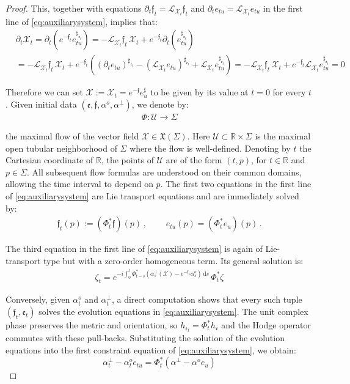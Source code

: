\documentclass[10pt,reqno,a4paper]{amsart}
\theoremstyle{plain}
\theoremstyle{definition}
\theoremstyle{remark}
\theoremstyle{remark}
\def\dd{\mathrm{d}}
\def\cL{\mathcal{L}}
\def\cX{\mathcal{X}}
\def\cL{\mathcal{L}}
\def\cU{\mathcal{U}}
\def\fre{\mathfrak{e}}
\renewcommand{\(}{ (}
\renewcommand{\)}{ )}
\newcommand{\frf}{\mathfrak{f}}
\begin{document}
\begin{proof}
\noindent
This, together with equations $\partial_t \frf_t =  \cL_{\cX_t}\frf_t$ and $\partial_t e_{tu} = \mathcal{L}_{\cX_t} e_{tu}$ in the first line of \eqref{eq:auxiliarysystem}, implies that:
\begin{eqnarray*}
 & \partial_t \cX_t = \partial_t (e^{-\frf_t} e^{\sharp_{\fre_t}}_{tu})  =  -  \cL_{\cX_t}\frf_t\, \cX_t + e^{-\frf_t}  \partial_t (e^{\sharp_{\fre_t}}_{tu}) \\
 & =  -  \cL_{\cX_t}\frf_t\, \cX_t + e^{-\frf_t}  ((\partial_t e_{tu})^{\sharp_{\fre_t}} -   (\cL_{\cX_t} e_{tu})^{\sharp_{\fre_t}} + \cL_{\cX_t} e_{tu}^{\sharp_{\fre_t}}) = -  \cL_{\cX_t}\frf_t\, \cX_t + e^{-\frf_t} \cL_{\cX_t} e_{tu}^{\sharp_{\fre_t}} = 0
\end{eqnarray*}

\noindent
Therefore we can set $\cX := \cX_t = e^{-\frf} e^{\sharp}_u$ to be given by its value at $t=0$ for every $t$. Given initial data $(\fre,\frf,\alpha^o,\alpha^{\perp})$, we denote by:
\begin{eqnarray*}
\Phi \colon \cU \to \Sigma
\end{eqnarray*}

\noindent
the maximal flow of the vector field $\cX\in \mathfrak{X}(\Sigma)$. Here $\cU \subset \mathbb{R} \times \Sigma$ is the maximal open tubular neighborhood of $\Sigma$ where the flow is well-defined. Denoting by $t$ the Cartesian coordinate of $\mathbb{R}$, the points of $\cU$ are of the form $(t,p)$, for $t\in\mathbb{R}$ and $p\in \Sigma$. All subsequent flow formulas are understood on their common domains, allowing the time interval to depend on $p$. The first two equations in the first line of \eqref{eq:auxiliarysystem} are Lie transport equations and are immediately solved by:
\begin{eqnarray*}
\frf_t (p) := (\Phi^{\ast}_t\frf) (p)\, , \qquad \  e_{tu}(p) = (\Phi^{\ast}_t e_u)(p) \, .
\end{eqnarray*}

\noindent
The third equation in the first line of \eqref{eq:auxiliarysystem} is again of Lie-transport type but with a zero-order homogeneous term. Its general solution is:
\begin{eqnarray*}
\zeta_t = e^{- i \int_0^t \Phi^{\ast}_{t-s} (\alpha^{\perp}_s (\cX) - e^{-\frf_s} \alpha^o_s)\, \dd s}\, \Phi_t^{\ast} \zeta    
\end{eqnarray*} 

\noindent 
Conversely, given $\alpha^o_t$ and $\alpha^{\perp}_t$, a direct computation shows that every such tuple $(\frf_t , \fre_t)$ solves the evolution equations in \eqref{eq:auxiliarysystem}. The unit complex phase preserves the metric and orientation, so $h_{\fre_t}=\Phi_t^{\ast}h_{\fre}$ and the Hodge operator commutes with these pull-backs. Substituting the solution of the evolution equations into the first constraint equation of \eqref{eq:auxiliarysystem}, we obtain:
\begin{equation}
\label{eq:transversalpullback}
\alpha^{\perp}_t   - \alpha^o_t e_{tu}   = \Phi^{\ast}_t (\alpha^{\perp} - \alpha^o e_{u})   
\end{equation}


\end{proof}
\end{document}

